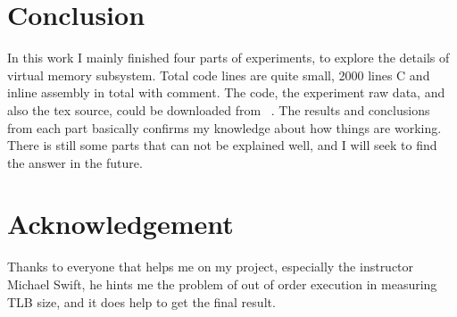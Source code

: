 \section{Conclusion}
    \label{sec:conc}
   In this work I mainly finished four parts of experiments, to explore the
   details of virtual memory subsystem. Total code lines are quite small, 2000
   lines C and inline assembly in total with comment. The code, the experiment
   raw data, and also the tex source, could be downloaded from ~\cite{github}.
   The results and conclusions from each part basically confirms my knowledge
   about how things are working. There is still some parts that can not be
   explained well, and I will seek to find the answer in the future.

\section{Acknowledgement}
    \label{sec:ack}
   Thanks to everyone that helps me on my project, especially the instructor Michael Swift, he hints me the problem of out of order execution in measuring TLB size, and it does help to get the final result.


